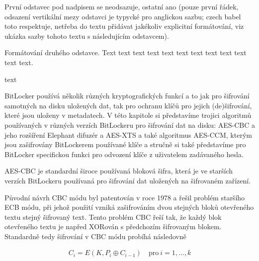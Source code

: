 
První odstavec pod nadpisem se neodsazuje, ostatní ano (pouze první řádek, odsazení vertikální mezy odstavci je typycké pro anglickou sazbu; czech babel toto respektuje, netřeba do textu přidávat jakékoliv explicitní formátování, viz ukázka sazby tohoto textu s následujícím odstavcem).

Formátování druhého odstavce. Text text text text text text text text text text text text.




text

\label{sec:algorithms}

BitLocker používá několik různých kryptografických funkcí a to jak pro šifrování samotných na disku uložených dat, tak pro ochranu klíčů pro jejich (de)šifrování, které jsou uloženy v metadatech. V této kapitole si představíme trojici algoritmů používaných v různých verzích BitLockeru pro šifrování dat na disku: AES-CBC a jeho rozšíření Elephant difuzér a AES-XTS a také algoritmus AES-CCM, kterým jsou zašifrovány BitLockerem používané klíče a stručně si také představíme pro BitLocker specifickou funkci pro odvození klíče z uživatelem zadávaného hesla.

\label{sec:aes-cbc}

AES-CBC je standardní široce používaná bloková šifra, která je ve starších verzích BitLockeru používaná pro šifrování dat uložených na šifrovaném zařízení.

Původní návrh CBC módu byl patentován v roce 1978\cite{Ehrsam1978} a řešil problém staršího ECB módu, při jehož použití vzniká zašifrováním dvou stejných bloků otevřeného textu stejný šifrovaný text. Tento problém CBC řeší tak, že každý blok otevřeného textu je napřed XORován s předchozím šifrovaným blokem. Standardně tedy šifrování v CBC módu probíhá následovně

\begin{align*}
C_i = E(K, P_i \oplus C_{i-1}) \quad \text{pro}\ i = 1, \dots, k \\
\end{align*}

